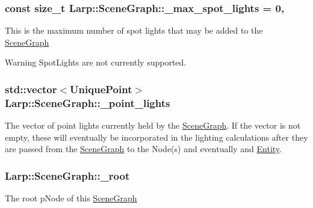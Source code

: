\subsubsection[{\texorpdfstring{\+\_\+max\+\_\+spot\+\_\+lights}{_max_spot_lights}}]{\setlength{\rightskip}{0pt plus 5cm}const size\+\_\+t Larp\+::\+Scene\+Graph\+::\+\_\+max\+\_\+spot\+\_\+lights = 0\hspace{0.3cm}{\ttfamily [static]}, {\ttfamily [private]}}\hypertarget{classLarp_1_1SceneGraph_a3f308c89413969e78b25014dcaedab1f}{}\label{classLarp_1_1SceneGraph_a3f308c89413969e78b25014dcaedab1f}
This is the maximum number of spot lights that may be added to the \hyperlink{classLarp_1_1SceneGraph}{Scene\+Graph} \begin{DoxyWarning}{Warning}
Spot\+Lights are not currently supported. 
\end{DoxyWarning}
\subsubsection[{\texorpdfstring{\+\_\+point\+\_\+lights}{_point_lights}}]{\setlength{\rightskip}{0pt plus 5cm}std\+::vector$<${\bf Unique\+Point}$>$ Larp\+::\+Scene\+Graph\+::\+\_\+point\+\_\+lights\hspace{0.3cm}{\ttfamily [private]}}\hypertarget{classLarp_1_1SceneGraph_a1b72e08d2d1edbf959b9fcad65a8241d}{}\label{classLarp_1_1SceneGraph_a1b72e08d2d1edbf959b9fcad65a8241d}
The vector of point lights currently held by the \hyperlink{classLarp_1_1SceneGraph}{Scene\+Graph}. If the vector is not empty, these will eventually be incorporated in the lighting calculations after they are passed from the \hyperlink{classLarp_1_1SceneGraph}{Scene\+Graph} to the Node(s) and eventually and \hyperlink{classLarp_1_1Entity}{Entity}. 
\subsubsection[{\texorpdfstring{\+\_\+root}{_root}}]{ Larp\+::\+Scene\+Graph\+::\+\_\+root\hspace{0.3cm}{\ttfamily [private]}}\hypertarget{classLarp_1_1SceneGraph_a88a58f51a6937827ae1d814d0b44a0d7}{}\label{classLarp_1_1SceneGraph_a88a58f51a6937827ae1d814d0b44a0d7}
The root p\+Node of this \hyperlink{classLarp_1_1SceneGraph}{Scene\+Graph} 
